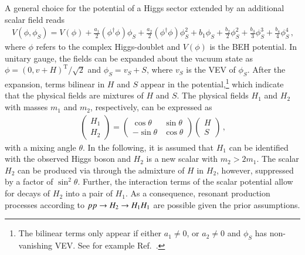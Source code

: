 \begin{description}
  A general choice for the potential of a Higgs sector extended by an additional
  scalar field
  reads~\cite{OConnell:2006rsp,No:2013wsa,Chen:2014ask,DiMicco:2019ngk}
  \begin{align*}
    V(\phi, \phi_{S}) = V(\phi)
    + \frac{a_1}{2} (\phi^\dagger \phi) \phi_{S}
    + \frac{a_2}{2} (\phi^\dagger \phi) \phi_{S}^2
    + b_1 \phi_{S} + \frac{b_2}{2} \phi_{S}^2 + \frac{b_3}{3} \phi_{S}^3 + \frac{b_4}{4} \phi_{S}^4 \,\text{,}
  \end{align*}
  where $\phi$ refers to the complex Higgs-doublet and $V(\phi)$ is the BEH
  potential. In unitary gauge, the fields can be expanded about the vacuum state
  as $\phi = (0, v + H)^{\text{T}} / \sqrt{2}$ and $\phi_{S} = v_{S} + S$, where
  $v_{S}$ is the VEV of $\phi_{S}$. After the expansion, terms bilinear in $H$
  and $S$ appear in the potential,\footnote{The bilinear terms only appear if
    either $a_1 \neq 0$, or $a_2 \neq 0$ and $\phi_{S}$ has non-vanishing
    VEV. See for example Ref.~\cite{Chen:2014ask}.} which indicate that the
  physical fields are mixtures of $H$ and $S$. The physical fields $H_1$ and
  $H_2$ with masses $m_1$ and $m_2$, respectively, can be expressed as
  \begin{align*}
    \begin{pmatrix}
      H_1 \\
      H_2
    \end{pmatrix}
    =
    \begin{pmatrix}
      \cos\theta & \sin\theta \\
      -\sin\theta & \cos\theta
    \end{pmatrix}
    \begin{pmatrix}
      H \\
      S
    \end{pmatrix} \,\text{,}
  \end{align*}
  with a mixing angle $\theta$. In the following, it is assumed that $H_1$ can
  be identified with the observed Higgs boson and $H_2$ is a new scalar with
  $m_2 > 2 m_1$.  The scalar $H_2$ can be produced via \ggF through the
  admixture of $H$ in $H_2$, however, suppressed by a factor of
  $\sin^2\theta$. Further, the interaction terms of the scalar potential allow
  for decays of $H_2$ into a pair of $H_1$. As a consequence, resonant
  production processes according to $pp \to H_2 \to H_1 H_1$ are possible given
  the prior assumptions.


\end{description}
